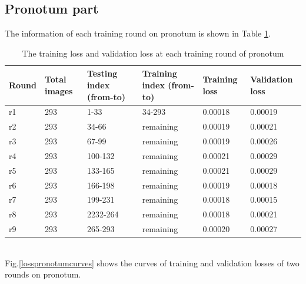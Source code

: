 \documentclass[12pt,a4paper]{article}
\begin{document}
\subsection{Pronotum part}
The information of each training round on pronotum is shown in Table \ref{pronoloss}.
\begin{table}[h!]
	\centering
	\begin{tabular}{l p{2cm} p{2.4cm} p{2.6cm} p{2.2cm} p{2.2cm}}
	Round & Total images & Testing index (from-to) & Training index (from-to) & Training loss & Validation loss \\ \hline
	r1 & 293 & 1-33 & 34-293 & 0.00018 & 0.00019 \\ \hline
	r2 & 293 & 34-66 & remaining & 0.00019 & 0.00021 \\ \hline
	r3 & 293 & 67-99 & remaining & 0.00019 & 0.00026 \\ \hline
	r4 & 293 & 100-132 & remaining & 0.00021 & 0.00029 \\ \hline
	r5 & 293 & 133-165 & remaining & 0.00021 & 0.00029 \\ \hline
	r6 & 293 & 166-198 & remaining & 0.00019 & 0.00018 \\ \hline
	r7 & 293 & 199-231 & remaining & 0.00018 & 0.00015 \\ \hline
	r8 & 293 & 2232-264 & remaining & 0.00018 & 0.00021 \\ \hline
	r9 & 293 & 265-293 & remaining & 0.00020 & 0.00027 \\ \hline	
	\end{tabular}
	\caption{The training loss and validation loss at each training round of pronotum}
	\label{pronoloss}
\end{table}~\\[5cm]
Fig.\ref{losspronotumcurves} shows the curves of training and validation losses of two rounds on pronotum.
\end{document}
